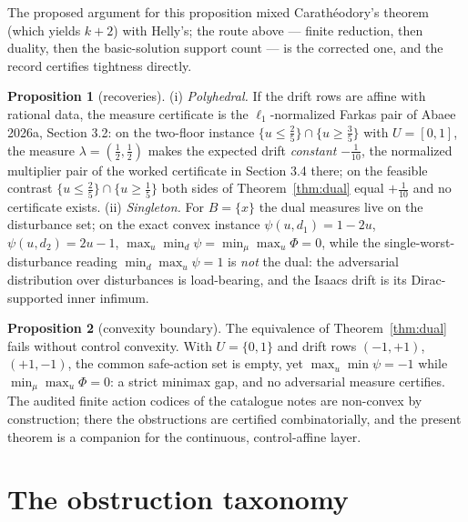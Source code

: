 \documentclass[10pt,twocolumn]{article}
\theoremstyle{definition}
\newtheorem{proposition}{Proposition}
\begin{document}
The proposed argument for this proposition mixed Carath\'{e}odory's
theorem (which yields $k+2$) with Helly's; the route above --- finite
reduction, then duality, then the basic-solution support count --- is the
corrected one, and the record certifies tightness directly.

\begin{proposition}[recoveries]\label{prop:recover}
(i) \emph{Polyhedral.} If the drift rows are affine with rational data,
the measure certificate is the $\ell_{1}$-normalized Farkas pair of
Abaee 2026a, Section 3.2: on the two-floor instance
$\{u \le \tfrac25\} \cap \{u \ge \tfrac35\}$ with $U = [0,1]$, the
measure $\lambda = (\tfrac12,\tfrac12)$ makes the expected drift
\emph{constant} $-\tfrac1{10}$, the normalized multiplier pair of the
worked certificate in Section 3.4 there; on the feasible contrast
$\{u \le \tfrac25\} \cap \{u \ge \tfrac15\}$ both sides of
Theorem~\ref{thm:dual} equal $+\tfrac1{10}$ and no certificate exists.
(ii) \emph{Singleton.} For $B = \{x\}$ the dual measures live on the
disturbance set; on the exact convex instance
$\psi(u,d_{1}) = 1-2u$, $\psi(u,d_{2}) = 2u-1$,
$\max_{u}\min_{d}\psi = \min_{\mu}\max_{u}\Phi = 0$, while the
single-worst-disturbance reading $\min_{d}\max_{u}\psi = 1$ is
\emph{not} the dual: the adversarial distribution over disturbances is
load-bearing, and the Isaacs drift is its Dirac-supported inner
infimum.
\end{proposition}

\begin{proposition}[convexity boundary]\label{prop:gap}
The equivalence of Theorem~\ref{thm:dual} fails without control
convexity. With $U = \{0,1\}$ and drift rows
$(-1,+1)$, $(+1,-1)$, the common safe-action set is empty, yet
$\max_{u}\min\psi = -1$ while $\min_{\mu}\max_{u}\Phi = 0$: a strict
minimax gap, and no adversarial measure certifies. The audited finite
action codices of the catalogue notes are non-convex by construction;
there the obstructions are certified combinatorially, and the present
theorem is a companion for the continuous, control-affine layer.
\end{proposition}

\section{The obstruction taxonomy}
\end{document}
